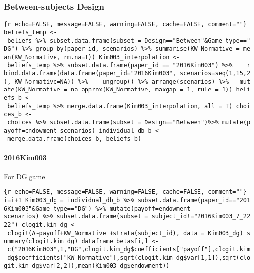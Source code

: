 \hypertarget{between-subjects-design}{%
\subsubsection{Between-subjects Design}\label{between-subjects-design}}

\texttt{\{r\ echo=FALSE,\ message=FALSE,\ warning=FALSE,\ cache=FALSE,\ comment=""\}\ beliefs\_temp\ \textless{}-\ beliefs\ \%\textgreater{}\%\ subset.data.frame(subset\ =\ Design=="Between"\&Game\_type=="DG")\ \%\textgreater{}\%\ group\_by(paper\_id,\ scenarios)\ \%\textgreater{}\%\ summarise(KW\_Normative\ =\ mean(KW\_Normative,\ rm.na=T))\ Kim003\_interpolation\ \textless{}-\ beliefs\_temp\ \%\textgreater{}\%\ subset.data.frame(paper\_id\ ==\ "2016Kim003")\ \%\textgreater{}\%\ \ \ \ rbind.data.frame(data.frame(paper\_id="2016Kim003",\ scenarios=seq(1,15,2),\ KW\_Normative=NA))\ \%\textgreater{}\%\ \ \ \ ungroup()\ \%\textgreater{}\%\ arrange(scenarios)\ \%\textgreater{}\%\ \ \ mutate(KW\_Normative\ =\ na.approx(KW\_Normative,\ maxgap\ =\ 1,\ rule\ =\ 1))\ beliefs\_b\ \textless{}-\ beliefs\_temp\ \%\textgreater{}\%\ merge.data.frame(Kim003\_interpolation,\ all\ =\ T)\ choices\_b\ \textless{}-\ choices\ \%\textgreater{}\%\ subset.data.frame(subset\ =\ Design=="Between")\%\textgreater{}\%\ mutate(payoff=endowment-scenarios)\ individual\_db\_b\ \textless{}-\ merge.data.frame(choices\_b,\ beliefs\_b)}

\hypertarget{kim003}{%
\paragraph{2016Kim003}\label{kim003}}

For DG game

\texttt{\{r\ echo=FALSE,\ message=FALSE,\ warning=FALSE,\ cache=FALSE,\ comment=""\}\ i=i+1\ Kim003\_dg\ =\ individual\_db\_b\ \%\textgreater{}\%\ subset.data.frame(paper\_id=="2016Kim003"\&Game\_type=="DG")\ \%\textgreater{}\%\ mutate(payoff=endowment-scenarios)\ \%\textgreater{}\%\ subset.data.frame(subset\ =\ subject\_id!="2016Kim003\_7\_2222")\ clogit.kim\_dg\ \textless{}-\ clogit(A\textasciitilde{}payoff+KW\_Normative\ +strata(subject\_id),\ data\ =\ Kim003\_dg)\ summary(clogit.kim\_dg)\ dataframe\_betas{[}i,{]}\ \textless{}-\ c("2016Kim003",1,"DG",clogit.kim\_dg\$coefficients{[}"payoff"{]},clogit.kim\_dg\$coefficients{[}"KW\_Normative"{]},sqrt(clogit.kim\_dg\$var{[}1,1{]}),sqrt(clogit.kim\_dg\$var{[}2,2{]}),mean(Kim003\_dg\$endowment))}


